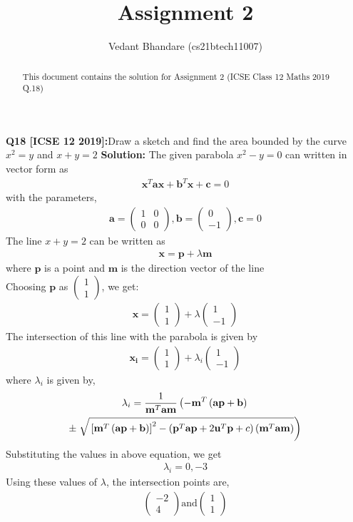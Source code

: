 \documentclass[journal,12pt,twocolumn]{IEEEtran}
\title{Assignment 2}
\author{ Vedant Bhandare (cs21btech11007)}
\providecommand{\sbrak}[1]{\ensuremath{{}\left[#1\right]}}
\providecommand{\brak}[1]{\ensuremath{\left(#1\right)}}
\providecommand{\lbrak}[1]{\ensuremath{\left(#1\right.}}
\providecommand{\rbrak}[1]{\ensuremath{\left.#1\right)}}
\theoremstyle{remark}
\newcommand{\myvec}[1]{\ensuremath{\begin{pmatrix}#1\end{pmatrix}}}
\let\vec\mathbf
\begin{document}
\maketitle
\begin{abstract}
This document contains the solution for Assignment 2 (ICSE Class 12 Maths 2019 Q.18)
\end{abstract}
\textbf{Q18 [ICSE 12 2019]:}Draw a sketch and find the area bounded by the curve $x^2 = y$ and $x + y = 2$
\textbf{Solution: } The given parabola $x^2 - y = 0$ can written in vector form as
\begin{align}
    \vec{x}^T\vec{a}\vec{x} + \vec{b}^T\vec{x} + \vec{c} = 0
\end{align}
with the parameters,
\begin{align}
    \vec{a} = \myvec{1 & 0 \\ 0 & 0}, \vec{b} = \myvec{0 \\ -1}, \vec{c} = 0
\end{align}
The line $x + y = 2$ can be written as
\begin{align}
    \vec{x} = \vec{p} + \lambda \vec{m}
\end{align}
where $\vec{p}$ is a point and $\vec{m}$ is the direction vector of the line\\
Choosing $\vec{p}$ as $\myvec{1 \\ 1}$, we get:
\begin{align}
    \vec{x} = \myvec{1 \\ 1} + \lambda \myvec{1 \\ -1}
\end{align}
The intersection of this line with the parabola is given by
\begin{align}
    \vec{x_i} = \myvec{1 \\ 1} + \lambda_i \myvec{1 \\ -1}
\end{align}
where $\lambda_i$ is given by,
\begin{multline}
\footnotesize
    \lambda_i = \frac{1}
{
\vec{m}^T\vec{a}\vec{m}
}
\lbrak{-\vec{m}^T\brak{\vec{a}\vec{p}+\vec{b}}}
\\
\pm
\rbrak{\sqrt{\sbrak{\vec{m}^T\brak{\vec{a}\vec{p}+\vec{b}}
}^2
-
\brak
{
\vec{p}^T\vec{a}\vec{p} + 2\vec{u}^T\vec{p} +c
}
\brak{\vec{m}^T\vec{a}\vec{m}}
}
}
\label{eq:tangent_roots}
\end{multline}
Substituting the values in above equation, we get
\begin{align}
    \lambda_i = 0, -3
\end{align}
Using these values of $\lambda$, the intersection points are,
\begin{align}
    \myvec{-2 \\ 4} \text{and} \myvec{1 \\ 1}
\end{align}
\end{document}
